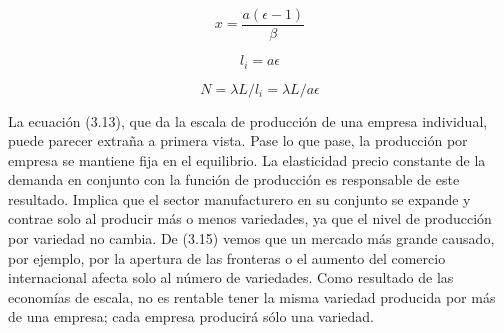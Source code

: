 \begin{equation}
    x=\dfrac{a(\epsilon - 1)}{\beta}
\end{equation}

\begin{equation}
    l_i = a\epsilon
\end{equation}

\begin{equation}
    N = \lambda L / l_i = \lambda L/a\epsilon
\end{equation}

La ecuación (3.13), que da la escala de producción de una empresa individual, puede parecer extraña a primera vista. Pase lo que pase, la producción por empresa se mantiene fija en el equilibrio. La elasticidad precio constante de la demanda en conjunto con la función de producción es responsable de este resultado. Implica que el sector manufacturero en su conjunto se expande y contrae solo al producir más o menos variedades, ya que el nivel de producción por variedad no cambia. De (3.15) vemos que un mercado más grande causado, por ejemplo, por la apertura de las fronteras o el aumento del comercio internacional afecta solo al número de variedades. Como resultado de las economías de escala, no es rentable tener la misma variedad producida por más de una empresa; cada empresa producirá sólo una variedad.\\
